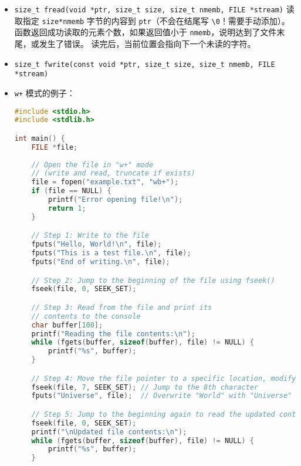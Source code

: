\begin{itemize}
\begin{lstlisting}[language=cpp]
    // Null-terminate the buffer if any data was read
    if (bytesRead > 0)
        buffer[bytesRead] = '\0';

    // Check if we reached EOF
    if (feof(file))
        printf("End of file reached.\n");
    // Check for read errors
    else if (ferror(file))
        perror("Error reading file");

    // Print the string
    printf("Read string: %s\n", buffer);

    // Free the allocated memory and close the file
    free(buffer);
    fclose(file);

    return 0;
}
\end{lstlisting}
\item \verb`size_t fread(void *ptr, size_t size, size_t nmemb, FILE *stream)` 读取指定 \verb`size*nmemb` 字节的内容到 \verb`ptr`（不会在结尾写 \verb`\0`！需要手动添加）。 函数返回成功读取的元素个数，如果返回值小于 \verb`nmemb`，说明达到了文件末尾，或发生了错误。 读完后，当前位置会指向下一个未读的字符。
\item \verb`size_t fwrite(const void *ptr, size_t size, size_t nmemb, FILE *stream)`
\item \verb`w+` 模式的例子：
\begin{lstlisting}[language=cpp]
#include <stdio.h>
#include <stdlib.h>

int main() {
    FILE *file;
    
    // Open the file in "w+" mode
    // (write and read, truncate if exists)
    file = fopen("example.txt", "wb+");
    if (file == NULL) {
        printf("Error opening file!\n");
        return 1;
    }

    // Step 1: Write to the file
    fputs("Hello, World!\n", file);
    fputs("This is a test file.\n", file);
    fputs("End of writing.\n", file);

    // Step 2: Jump to the beginning of the file using fseek()
    fseek(file, 0, SEEK_SET);

    // Step 3: Read from the file and print its
    // contents to the console
    char buffer[100];
    printf("Reading the file contents:\n");
    while (fgets(buffer, sizeof(buffer), file) != NULL) {
        printf("%s", buffer);
    }

    // Step 4: Move the file pointer to a specific location, modify contents
    fseek(file, 7, SEEK_SET); // Jump to the 8th character
    fputs("Universe", file);  // Overwrite "World" with "Universe"

    // Step 5: Jump to the beginning again to read the updated content
    fseek(file, 0, SEEK_SET);
    printf("\nUpdated file contents:\n");
    while (fgets(buffer, sizeof(buffer), file) != NULL) {
        printf("%s", buffer);
    }


\end{lstlisting}
\end{itemize}
